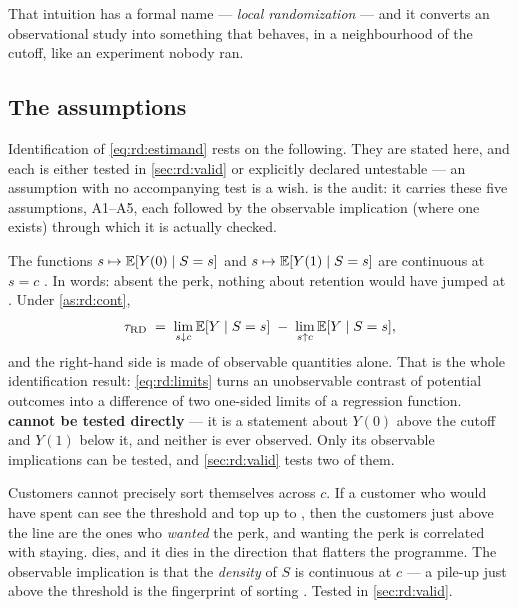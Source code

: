 That intuition has a formal name --- \emph{local randomization} \citep{lee2010, cattaneo2016} ---
and it converts an observational study into something that behaves, in a neighbourhood of the
cutoff, like an experiment nobody ran.

\subsection*{The assumptions}

Identification of \cref{eq:rd:estimand} rests on the following. They are stated here, and each is
either tested in \cref{sec:rd:valid} or explicitly declared untestable --- an assumption with no
accompanying test is a wish.  is the audit: it carries these five
assumptions, A1--A5, each followed by the observable implication (where one exists) through which it
is actually checked.

\begin{assumption}\label{as:rd:cont}
The functions $s \mapsto \operatorname{\mathbb{E}}[Y(0) \mid S = s]$ and $s \mapsto \operatorname{\mathbb{E}}[Y(1) \mid S = s]$ are continuous at
$s = c$ \citep{hahn2001}. In words: absent the perk, nothing about retention would have jumped at
\eur{\nbNineCutoff}. Under \cref{as:rd:cont},
%
\begin{equation}
  \tau_{\mathrm{RD}}
  \;=\; \lim_{s \downarrow c} \operatorname{\mathbb{E}}[Y \mid S = s] \;-\; \lim_{s \uparrow c} \operatorname{\mathbb{E}}[Y \mid S = s],
  \label{eq:rd:limits}
\end{equation}
%
and the right-hand side is made of observable quantities alone. That is the whole identification
result: \cref{eq:rd:limits} turns an unobservable contrast of potential outcomes into a difference
of two one-sided limits of a regression function. \textbf{ cannot be tested
directly} --- it is a statement about $Y(0)$ above the cutoff and $Y(1)$ below it, and neither is
ever observed. Only its observable implications can be tested, and \cref{sec:rd:valid} tests two of
them.
\end{assumption}

\begin{assumption}\label{as:rd:manip}
Customers cannot precisely sort themselves across $c$. If a customer who would have spent 
can see the threshold and top up to , then the customers just above the line are the ones
who \emph{wanted} the perk, and wanting the perk is correlated with staying.  dies,
and it dies in the direction that flatters the programme. The observable implication is that the
\emph{density} of $S$ is continuous at $c$ --- a pile-up just above the threshold is the
fingerprint of sorting \citep{mccrary2008}. Tested in \cref{sec:rd:valid}.
\end{assumption}

